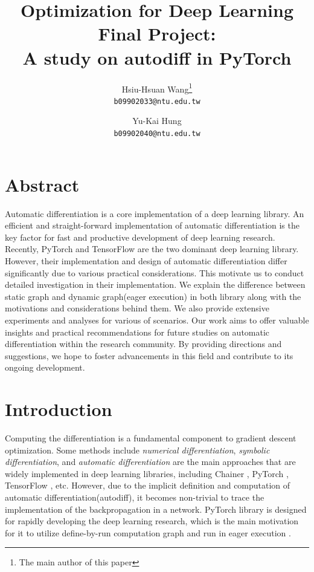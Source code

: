 \documentclass[12pt,twocolumn,letterpaper]{extarticle}
\begin{document}
\title{Optimization for Deep Learning Final Project: \\
A study on autodiff in PyTorch}
\author{
  Hsiu-Hsuan Wang\thanks{The main author of this paper} \\
  \texttt{b09902033@ntu.edu.tw}
  \and
  Yu-Kai Hung \\
  \texttt{b09902040@ntu.edu.tw}
}
\date{}
\maketitle

\section*{Abstract}

Automatic differentiation is a core implementation of a deep learning library. An efficient and straight-forward implementation of automatic differentiation is the key factor for fast and productive development of deep learning research. Recently, PyTorch and TensorFlow are the two dominant deep learning library. However, their implementation and design of automatic differentiation differ significantly due to various practical considerations. This motivate us to conduct detailed investigation in their implementation. We explain the difference between static graph and dynamic graph\;(eager execution) in both library along with the motivations and considerations behind them. We also provide extensive experiments and analyses for various of scenarios. Our work aims to offer valuable insights and practical recommendations for future studies on automatic differentiation within the research community. By providing directions and suggestions, we hope to foster advancements in this field and contribute to its ongoing development.

\section{Introduction}

Computing the differentiation is a fundamental component to gradient descent optimization. Some methods include \emph{numerical differentiation}, \emph{symbolic differentiation}, and \emph{automatic differentiation} are the main approaches that are widely implemented in deep learning libraries, including Chainer \cite{tokui2015chainer}, PyTorch \cite{NEURIPS2019_bdbca288}, TensorFlow \cite{45381}, etc. However, due to the implicit definition and computation of automatic differentiation\;(autodiff), it becomes non-trivial to trace the implementation of the backpropagation in a network. PyTorch library is designed for rapidly developing the deep learning research, which is the main motivation for it to utilize define-by-run computation graph and run in eager execution \cite{paszke2017automatic}. 
\end{document}
